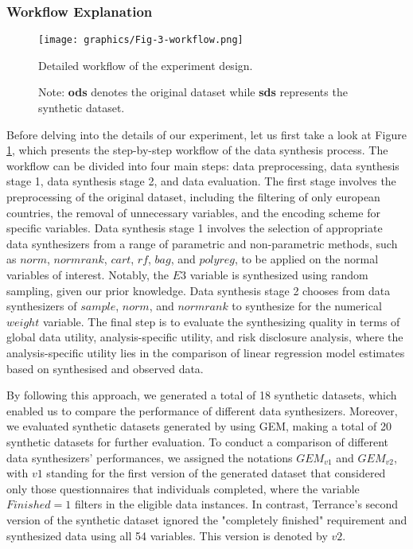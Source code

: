\subsubsection{Workflow Explanation}
\label{subsubsec:workflow}

\begin{figure}[H]
    \centering
    \texttt{[image: graphics/Fig-3-workflow.png]}    
    \caption{Detailed workflow of the experiment design.}
    \label{fig:workflow}
    \caption*{Note: \textbf{ods} denotes the original dataset while \textbf{sds} represents the synthetic dataset.}
\end{figure}


Before delving into the details of our experiment, let us first take a look at Figure \ref{fig:workflow}, which presents the step-by-step workflow of the data synthesis process. 
The workflow can be divided into four main steps: data preprocessing, data synthesis stage 1, data synthesis stage 2, and data evaluation. The first stage involves the preprocessing of 
the original dataset, including the filtering of only european countries, the removal of unnecessary variables, and the encoding scheme for specific variables. Data synthesis stage 1 
involves the selection of appropriate data synthesizers from a range of parametric and non-parametric methods, such as $norm$, $normrank$, $cart$, $rf$, $bag$, 
and $polyreg$, to be applied on the normal variables of interest. Notably, the $E3$ variable is synthesized using random sampling, given our prior knowledge. Data synthesis stage 2 
chooses from data synthesizers of $sample$, $norm$, and $normrank$ to synthesize for the numerical $weight$ variable. The final step is to evaluate the synthesizing quality 
in terms of global data utility, analysis-specific utility, and risk disclosure analysis, where the analysis-specific utility lies in the comparison of linear regression model estimates based on 
synthesised and observed data.


By following this approach, we generated a total of 18 synthetic datasets, which enabled us to compare the performance of different data synthesizers. Moreover, we evaluated synthetic datasets generated by \citet{liu2021iterative} using GEM, making a total of 20 synthetic datasets for further evaluation. To conduct a comparison of different data synthesizers' performances, we assigned the notations $GEM_{v1}$ and $GEM_{v2}$, with $v1$ standing for the first version of the generated dataset that considered only those questionnaires that individuals completed, where the variable $Finished = 1$ filters in the eligible data instances. In contrast, Terrance's second version of the synthetic dataset ignored the "completely finished" requirement and synthesized data using all 54 variables. This version is denoted by $v2$.

